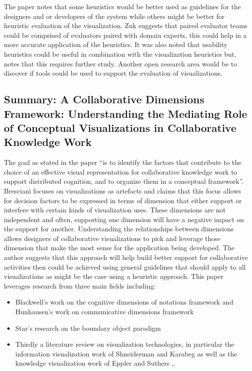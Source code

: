 \documentclass{sig-alternate}
\begin{document}
The paper notes that some heuristics would be better used as guidelines for the
designers and or developers of the system while others might be better for
heuristic evaluation of the visualization. Zuk suggests that paired evaluator
teams could be comprised of evaluators paired with domain experts, this could
help in a more accurate application of the heuristics. It was also noted that
usability heuristics could be useful in combination with the visualization
heuristics but, notes that this requires further study. Another open research
area would be to discover if tools could be used to support the evaluation of
visualizations.
\subsection{Summary: A Collaborative Dimensions Framework: Understanding the
Mediating Role of Conceptual Visualizations in Collaborative Knowledge Work
\cite{Bresciani:ACollaborativeDimensionsFramework}} The goal as stated in the
paper ``is to identify the factors that contribute to the choice of an effective
visual representation for collaborative knowledge work to support distributed
cognition, and to organize them in a conceptual framework''.  Bresciani  focuses
on visualizations as artefacts and claims that this focus allows for decision
factors to be expressed in terms of dimension that either support  or interfere
with certain kinds of visualization uses. These dimensions are not independent
and often, supporting one dimension will have a negative impact on the support
for another. Understanding the relationships between dimensions allows designers
of collaborative visualizations to pick and leverage those dimension that make
the most sense for the application being developed. The author suggests  that
this approach will help build better support for collaborative activities then
could be achieved using general guidelines that should apply to all
visualizations as might be the case using a heuristic approach. This paper
leverages research from three main fields including:

\begin{itemize}
\item Blackwell's work on the cognitive dimensions of notations framework
\cite{Blackwell:NotationalSystems} and Hunhausen's work on communicative
dimensions framework \cite{Hundhausen:CommunicativeDimensionsFramework}
\item Star's research on the boundary object paradigm \cite{Star:BoundaryObjects}
\item  Thirdly a literature review on visualization technologies, in
particular the information visualization work of Shneiderman and Karabeg as
well as the knowledge visualization work of Eppler and Suthers
\cite{Eppler:2004:FacilitatingKnowledgeCommunication},\cite{Suthers:2005:CollaborativeKnowledgeConstruction}.

\end{itemize}
\end{document}
